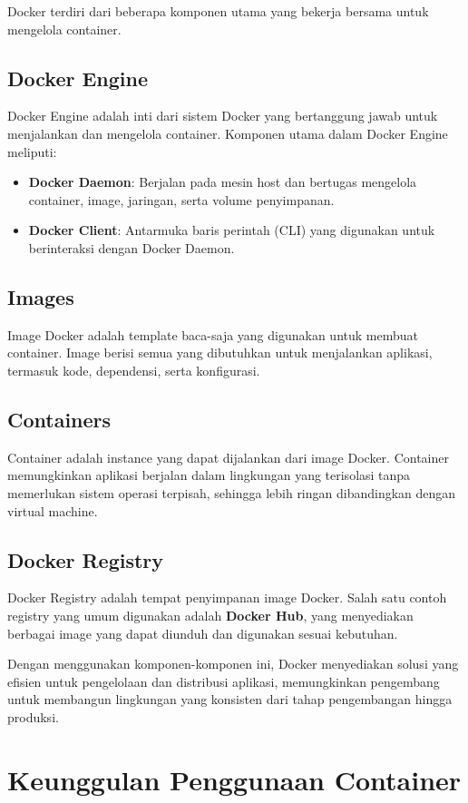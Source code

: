 Docker terdiri dari beberapa komponen utama yang bekerja bersama untuk mengelola container.

\subsection{Docker Engine}
Docker Engine adalah inti dari sistem Docker yang bertanggung jawab untuk menjalankan dan mengelola container. Komponen utama dalam Docker Engine meliputi:
\begin{itemize}
	\item \textbf{Docker Daemon}: Berjalan pada mesin host dan bertugas mengelola container, image, jaringan, serta volume penyimpanan.
	\item \textbf{Docker Client}: Antarmuka baris perintah (CLI) yang digunakan untuk berinteraksi dengan Docker Daemon.
\end{itemize}

\subsection{Images}
Image Docker adalah template baca-saja yang digunakan untuk membuat container. Image berisi semua yang dibutuhkan untuk menjalankan aplikasi, termasuk kode, dependensi, serta konfigurasi.

\subsection{Containers}
Container adalah instance yang dapat dijalankan dari image Docker. Container memungkinkan aplikasi berjalan dalam lingkungan yang terisolasi tanpa memerlukan sistem operasi terpisah, sehingga lebih ringan dibandingkan dengan virtual machine.

\subsection{Docker Registry}
Docker Registry adalah tempat penyimpanan image Docker. Salah satu contoh registry yang umum digunakan adalah \textbf{Docker Hub}, yang menyediakan berbagai image yang dapat diunduh dan digunakan sesuai kebutuhan.

Dengan menggunakan komponen-komponen ini, Docker menyediakan solusi yang efisien untuk pengelolaan dan distribusi aplikasi, memungkinkan pengembang untuk membangun lingkungan yang konsisten dari tahap pengembangan hingga produksi.

\section{Keunggulan Penggunaan Container}

